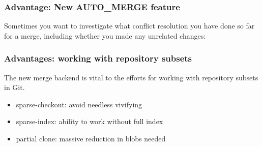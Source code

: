 \documentclass[compress,t]{beamer}
\begin{document}

\begin{frame}[fragile]
  \frametitle{Advantage: New AUTO\_MERGE feature}

  Sometimes you want to investigate what conflict resolution you have
  done so far for a merge, including whether you made any unrelated
  changes:\\
  \vspace*{\baselineskip}
  \qquad{}

  \begin{comment}
  ALTERNATE:

  There are a variety of questions users might ask while resolving
  conflicts:
  \vspace*{-\baselineskip}
  \begin{enumerate}
    \item What changes have been made since the previous (first) parent?
    \item What changes are staged?
    \item What is still unstaged? (or what is still conflicted?)
    \item What changes did I make to resolve conflicts so far?
  \end{enumerate}

  \vspace*{\baselineskip}
  The first three of these have simple answers:
  \begin{enumerate}
    \item \texttt{git diff HEAD}
    \item \texttt{git diff {-}{-}cached}
    \item \texttt{git diff}
  \end{enumerate}

  Due to the new merge strategy, the fourth now has an answer too:
  \begin{enumerate}[4]
    \item \texttt{git diff AUTO\_MERGE}
  \end{enumerate}
  \end{comment}

\end{frame}


\begin{frame}
  \frametitle{Advantages: working with repository subsets}

  The new merge backend is vital to the efforts for working with
  repository subsets in Git.
  \begin{itemize}
    \item sparse-checkout: avoid needless vivifying
    \item sparse-index: ability to work without full index
    \item partial clone: massive reduction in blobs needed
  \end{itemize}

\end{frame}
\end{document}
